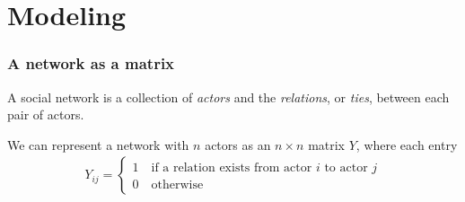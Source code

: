\documentclass[slidestop,compress, 10pt]{beamer}
\begin{document}
\section{Modeling}
\frame
{
\frametitle{A network as a matrix}
A social network is a collection of \emph{actors} and the \emph{relations}, or \emph{ties}, between each pair of actors.  

We can represent a network with $n$ actors as an $n \times n$ matrix $Y$, where each entry
\begin{align*}
	Y_{ij} =
	\begin{cases} 	1 \quad \text{if a relation exists from actor $i$ to actor $j$}\\
					0 \quad \text{otherwise}
	\end{cases}
\end{align*}

}
\end{document}
